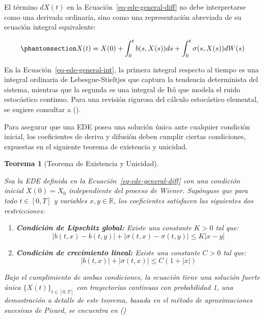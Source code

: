 \documentclass[
  spanish,
  letterpaper,
  DIV=11,
  numbers=noendperiod]{scrreprt}
\providecommand{\tightlist}{%
  \setlength{\itemsep}{0pt}\setlength{\parskip}{0pt}}
\theoremstyle{plain}
\newtheorem{theorem}{Teorema}[chapter]
\theoremstyle{definition}
\theoremstyle{remark}
\begin{document}
El término \(dX(t)\) en la Ecuación~\ref{eq-ede-general-diff} no debe
interpretarse como una derivada ordinaria, sino como una representación
abreviada de su ecuación integral equivalente:

\begin{equation}\phantomsection\label{eq-ede-general-int}{
X(t) = X(0) + \int_0^t b(s, X(s)) ds + \int_0^t \sigma(s, X(s)) dW(s)
}\end{equation}

En la Ecuación~\ref{eq-ede-general-int}, la primera integral respecto al
tiempo es una integral ordinaria de Lebesgue-Stieltjes que captura la
tendencia determinista del sistema, mientras que la segunda es una
integral de Itô que modela el ruido estocástico continuo. Para una
revisión rigurosa del cálculo estocástico elemental, se sugiere
consultar a ().

Para asegurar que una EDE posea una solución única ante cualquier
condición inicial, los coeficientes de deriva y difusión deben cumplir
ciertas condiciones, expuestas en el siguiente teorema de existencia y
unicidad.

\begin{theorem}[Teorema de Existencia y
Unicidad]\protect\hypertarget{thm-existencia-unicidad}{}\label{thm-existencia-unicidad}

Sea la EDE definida en la Ecuación~\ref{eq-ede-general-diff} con una
condición inicial \(X(0) = X_0\) independiente del proceso de Wiener.
Supóngase que para todo \(t \in [0, T]\) y variables
\(x, y \in \mathbb{R}\), los coeficientes satisfacen las siguientes dos
restricciones:

\begin{enumerate}
\def\labelenumi{\arabic{enumi}.}
\tightlist
\item
  \textbf{Condición de Lipschitz global:} Existe una constante \(K > 0\)
  tal que: \[
  |b(t, x) - b(t, y)| + |\sigma(t, x) - \sigma(t, y)| \le K |x - y|
  \]
\item
  \textbf{Condición de crecimiento lineal:} Existe una constante
  \(C > 0\) tal que: \[
  |b(t, x)| + |\sigma(t, x)| \le C (1 + |x|)
  \]
\end{enumerate}

Bajo el cumplimiento de ambas condiciones, la ecuación tiene una
solución fuerte única \(\{X(t)\}_{t \in [0, T]}\) con trayectorias
continuas con probabilidad 1, una demostración a detalle de este
teorema, basada en el método de aproximaciones sucesivas de Picard, se
encuentra en ()

\end{theorem}
\end{document}
